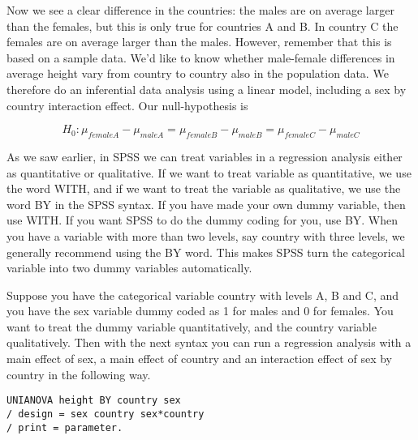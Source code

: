 \begin{knitrout}
\color{fgcolor}\begin{kframe}


{\ttfamily\noindent\bfseries{}}\end{kframe}
\end{knitrout}

Now we see a clear difference in the countries: the males are on average larger than the females, but this is only true for countries A and B. In country C the females are on average larger than the males. However, remember that this is based on a sample data. We'd like to know whether male-female differences in average height vary from country to country also in the population data. We therefore do an inferential data analysis using a linear model, including a sex by country interaction effect. Our null-hypothesis is 

\begin{equation}
H_0: \mu_{femaleA}-\mu_{maleA}=\mu_{femaleB}-\mu_{maleB}=\mu_{femaleC}-\mu_{maleC}
\end{equation}


As we saw earlier, in SPSS we can treat variables in a regression analysis either as quantitative or qualitative. If we want to treat variable as quantitative, we use the word WITH, and if we want to treat the variable as qualitative, we use the word BY in the SPSS syntax. If you have made your own dummy variable, then use WITH. If you want SPSS to do the dummy coding for you, use BY. When you have a variable with more than two levels, say country with three levels, we generally recommend using the BY word. This makes SPSS turn the categorical variable into two dummy variables automatically. 

Suppose you have the categorical variable country with levels A, B and C, and you have the sex variable dummy coded as 1 for males and 0 for females. You want to treat the dummy variable quantitatively, and the country variable qualitatively. Then with the next syntax you can run a regression analysis with a main effect of sex, a main effect of country and an interaction effect of sex by country in the following way.

\begin{verbatim}
UNIANOVA height BY country sex 
/ design = sex country sex*country
/ print = parameter.
\end{verbatim}


